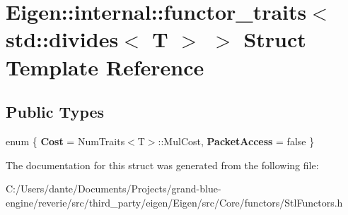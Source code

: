 \hypertarget{struct_eigen_1_1internal_1_1functor__traits_3_01std_1_1divides_3_01_t_01_4_01_4}{}\section{Eigen\+::internal\+::functor\+\_\+traits$<$ std\+::divides$<$ T $>$ $>$ Struct Template Reference}
\label{struct_eigen_1_1internal_1_1functor__traits_3_01std_1_1divides_3_01_t_01_4_01_4}
\subsection*{Public Types}
\begin{DoxyCompactItemize}
\item 
\mbox{\label{struct_eigen_1_1internal_1_1functor__traits_3_01std_1_1divides_3_01_t_01_4_01_4_a7bf7254035a5b604a8b55fa3a9a25bc9}} 
enum \{ {\bfseries Cost} = Num\+Traits$<$T$>$\+::Mul\+Cost, 
{\bfseries Packet\+Access} = false
 \}
\end{DoxyCompactItemize}


The documentation for this struct was generated from the following file\+:\begin{DoxyCompactItemize}
\item 
C\+:/\+Users/dante/\+Documents/\+Projects/grand-\/blue-\/engine/reverie/src/third\+\_\+party/eigen/\+Eigen/src/\+Core/functors/Stl\+Functors.\+h\end{DoxyCompactItemize}
